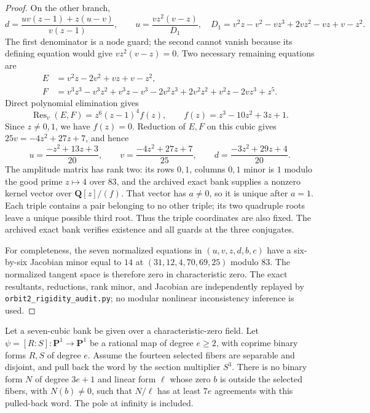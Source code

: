 \begin{proof}
On the other branch,
\[
 d=\frac{uv(z-1)+z(u-v)}{v(z-1)},\qquad
 u=\frac{vz^2(v-z)}{D_1},\quad
 D_1=v^2z-v^2-vz^3+2vz^2-vz+v-z^2.
\]
The first denominator is a node guard; the second cannot vanish because
its defining equation would give $vz^2(v-z)=0$.
Two necessary remaining equations are
\begin{align*}
 E&=v^2z-2v^2+vz+v-z^2,\\
 F&=v^3z^3-v^3z^2+v^3z-v^3-2v^2z^3
       +2v^2z^2+v^2z-2vz^3+z^5.
\end{align*}
Direct polynomial elimination gives
\[
 \operatorname{Res}_v(E,F)=z^6(z-1)^4f(z),\qquad
 f(z)=z^3-10z^2+3z+1.
\]
Since $z\ne0,1$, we have $f(z)=0$.  Reduction of $E,F$ on this
cubic gives $25v=-4z^2+27z+7$, and hence
\[
 u=\frac{-z^2+13z+3}{20},\qquad
 v=\frac{-4z^2+27z+7}{25},\qquad
 d=\frac{-3z^2+29z+4}{20}.
\]
The amplitude matrix has rank two: its rows $0,1$, columns $0,1$ minor
is $1$ modulo the good prime $z\mapsto4$ over $83$, and the archived
exact bank supplies a nonzero kernel vector over $\mathbf Q[z]/(f)$.
That vector has $a\ne0$, so it is unique after $a=1$.
Each triple contains a pair belonging to no other triple; its two
quadruple roots leave a unique possible third root.  Thus the triple
coordinates are also fixed.  The archived exact bank verifies existence
and all guards at the three conjugates.

For completeness, the seven normalized equations in
$(u,v,z,d,b,c)$ have a six-by-six Jacobian minor equal to $14$ at
$(31,12,4,70,69,25)$ modulo $83$.  The normalized tangent space is
therefore zero in characteristic zero.  The exact resultants,
reductions, rank minor, and Jacobian are independently replayed by
\texttt{orbit2\_rigidity\_audit.py}; no modular nonlinear
inconsistency inference is used.
\end{proof}

\begin{theorem}\label{thm:seven-bank-one-pole-obstruction}
Let a seven-cubic bank be given over a characteristic-zero field.
Let $\psi=[R:S]:\mathbf P^1\to\mathbf P^1$ be a rational map of
degree $e\ge2$, with coprime binary forms $R,S$ of degree $e$.
Assume the fourteen selected fibers are separable and disjoint, and
pull back the word by the section multiplier $S^3$.
There is no binary form $N$ of degree $3e+1$ and linear form $\ell$
whose zero $b$ is outside the selected fibers, with $N(b)\ne0$, such
that $N/\ell$ has at least $7e$ agreements with this pulled-back word.
The pole at infinity is included.
\end{theorem}

